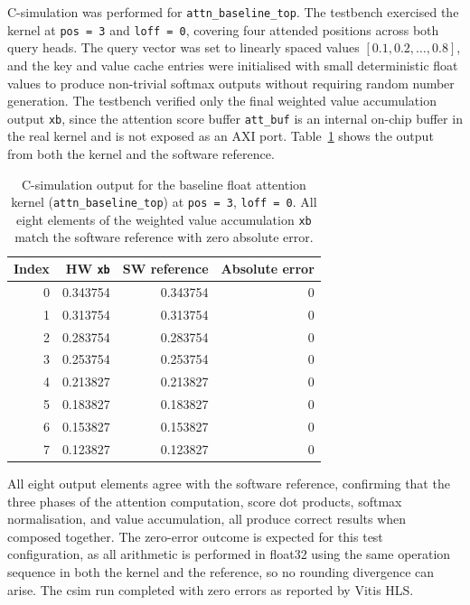 C-simulation was performed for \texttt{attn\_baseline\_top}. The
testbench exercised the kernel at \texttt{pos\,=\,3} and
\texttt{loff\,=\,0}, covering four attended positions across both query
heads. The query vector was set to linearly spaced values $[0.1, 0.2,
\ldots, 0.8]$, and the key and value cache entries were initialised
with small deterministic float values to produce non-trivial softmax
outputs without requiring random number generation. The testbench
verified only the final weighted value accumulation output \texttt{xb},
since the attention score buffer \texttt{att\_buf} is an internal
on-chip buffer in the real kernel and is not exposed as an AXI port.
Table~\ref{tab:attn_fp32_csim} shows the output from both the kernel
and the software reference.

\begin{table}[H]
  \centering
  \begin{tabular}{rrrr}
    \toprule
    Index & HW \texttt{xb} & SW reference & Absolute error \\
    \midrule
    0 & 0.343754 & 0.343754 & 0 \\
    1 & 0.313754 & 0.313754 & 0 \\
    2 & 0.283754 & 0.283754 & 0 \\
    3 & 0.253754 & 0.253754 & 0 \\
    4 & 0.213827 & 0.213827 & 0 \\
    5 & 0.183827 & 0.183827 & 0 \\
    6 & 0.153827 & 0.153827 & 0 \\
    7 & 0.123827 & 0.123827 & 0 \\
    \bottomrule
  \end{tabular}
  \caption{C-simulation output for the baseline float attention kernel
           (\texttt{attn\_baseline\_top}) at \texttt{pos\,=\,3},
           \texttt{loff\,=\,0}. All eight elements of the weighted value
           accumulation \texttt{xb} match the software reference
           with zero absolute error.}
  \label{tab:attn_fp32_csim}
\end{table}

All eight output elements agree with the software reference,
confirming that the three phases of the attention computation, score
dot products, softmax normalisation, and value accumulation, all
produce correct results when composed together. The zero-error outcome
is expected for this test configuration, as all arithmetic is performed in
float32 using the same operation sequence in both the kernel and the
reference, so no rounding divergence can arise. The csim run completed
with zero errors as reported by Vitis HLS.

